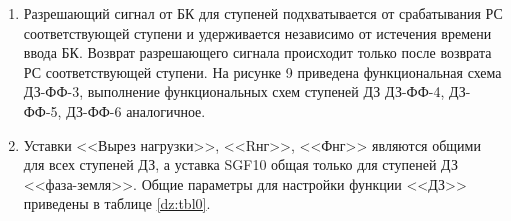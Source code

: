 \begin{enumerate}[label=\arabic{section}.\arabic{subsection}.\arabic{enumi}, labelsep=4pt, leftmargin=0pt, itemindent=57pt, itemsep=0pt, parsep=5pt]
\begin{enumerate}[label=\arabic{section}.\arabic{subsection}.\arabic{enumi}.\arabic*, labelsep=4pt, leftmargin=0em, itemindent=65pt, parsep=0pt]
\item
Разрешающий  сигнал  от  БК  для  ступеней  подхватывается  от  срабатывания  РС  соответствующей ступени  и  удерживается  независимо  от  истечения  времени  ввода  БК.  Возврат  разрешающего  сигнала происходит только после возврата РС соответствующей ступени. На рисунке 9 приведена функциональная схема ДЗ-ФФ-3, выполнение функциональных схем ступеней ДЗ ДЗ-ФФ-4, ДЗ-ФФ-5, ДЗ-ФФ-6 аналогичное. 
























\item
Уставки  <<Вырез  нагрузки>>,  <<Rнг>>,  <<Фнг>>  являются  общими  для  всех  ступеней ДЗ, а уставка SGF10 общая только для ступеней ДЗ <<фаза-земля>>. Общие параметры для настройки функции <<ДЗ>> приведены в таблице \ref{dz:tbl0}.


\end{enumerate}
\end{enumerate}
